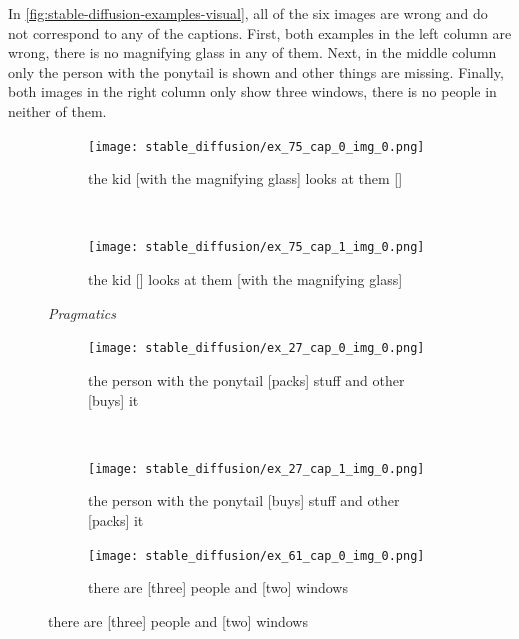 In \cref{fig:stable-diffusion-examples-visual}, all of the six images are wrong and do not correspond to any of the captions. First, both examples in the left column are wrong, there is no magnifying glass in any of them. Next, in the middle column only the person with the ponytail is shown and other things are missing. Finally, both images in the right column only show three windows, there is no people in neither of them.

\begin{figure}[ht]
\centering
    \begin{minipage}{.30\textwidth}
        \begin{subfigure}{\textwidth}
        \centering
        \texttt{[image: stable\_diffusion/ex\_75\_cap\_0\_img\_0.png]}
        \caption{\textcolor{BrickRed}{the kid [with the magnifying glass] looks at them [] \xmark}}
        \end{subfigure}\\
        \begin{subfigure}{\textwidth}
        \centering
        \texttt{[image: stable\_diffusion/ex\_75\_cap\_1\_img\_0.png]}
        \caption{\textcolor{BrickRed}{the kid [] looks at them [with the magnifying glass] \xmark}}
        \end{subfigure}%
        \caption*{\textit{Pragmatics}}
    \end{minipage}
    \hfill
    \begin{minipage}{.30\textwidth}
        \begin{subfigure}{\textwidth}
        \centering
        \texttt{[image: stable\_diffusion/ex\_27\_cap\_0\_img\_0.png]}
        \caption{\textcolor{BrickRed}{the person with the ponytail [packs] stuff and other [buys] it \xmark}}
        \end{subfigure}\\
        \begin{subfigure}{\textwidth}
        \centering
        \texttt{[image: stable\_diffusion/ex\_27\_cap\_1\_img\_0.png]}
        \caption{\textcolor{BrickRed}{the person with the ponytail [buys] stuff and other [packs] it \xmark}}
        \end{subfigure}%
        \caption*{\textit{Series}}
    \end{minipage}
    \hfill
    \begin{minipage}{.30\textwidth}
        \begin{subfigure}{\textwidth}
        \centering
        \texttt{[image: stable\_diffusion/ex\_61\_cap\_0\_img\_0.png]}
        \caption{\textcolor{BrickRed}{there are [three] people and [two] windows \xmark}}

\end{subfigure}
\end{minipage}
\end{figure}
